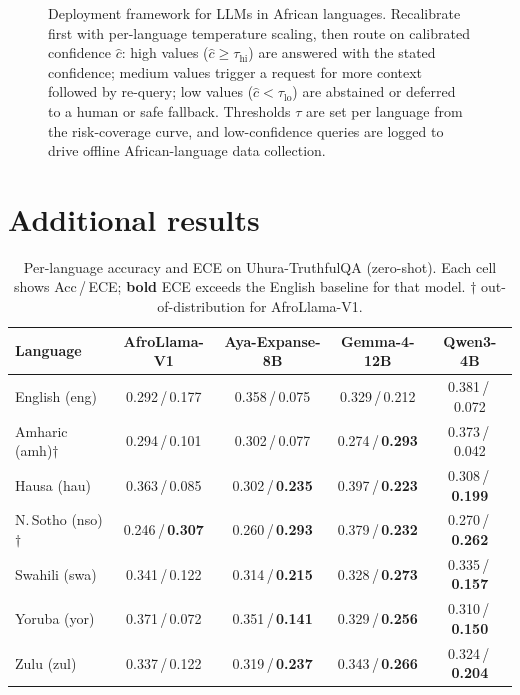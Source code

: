 \documentclass[11pt]{article}
\begin{document}
\begin{figure}[h]
{}
\caption{Deployment framework for LLMs in African languages. Recalibrate first with per-language
temperature scaling, then route on calibrated confidence $\hat{c}$: high values
($\hat{c}\geq\tau_{\mathrm{hi}}$) are answered with the stated confidence; medium values trigger a
request for more context followed by re-query; low values ($\hat{c}<\tau_{\mathrm{lo}}$) are
abstained or deferred to a human or safe fallback. Thresholds $\tau$ are set per language from the
risk-coverage curve, and low-confidence queries are logged to drive offline African-language data
collection.}
\label{fig:framework}
\end{figure}

\section{Additional results}\label{app:figs}

\begin{table}[h]\centering\small
\caption{Per-language accuracy and ECE on Uhura-TruthfulQA (zero-shot). Each cell shows Acc\,/\,ECE;
\textbf{bold} ECE exceeds the English baseline for that model. $\dagger$ out-of-distribution for
AfroLlama-V1.}
\label{tab:uhura_lang}
\begin{tabular}{lcccc}
\toprule
\textbf{Language} & \textbf{AfroLlama-V1} & \textbf{Aya-Expanse-8B} & \textbf{Gemma-4-12B} & \textbf{Qwen3-4B}\\
\midrule
English (eng)               & 0.292\,/\,0.177 & 0.358\,/\,0.075 & 0.329\,/\,0.212 & 0.381\,/\,0.072\\
\midrule
Amharic (amh)$\dagger$      & 0.294\,/\,0.101 & 0.302\,/\,0.077 & 0.274\,/\,\textbf{0.293} & 0.373\,/\,0.042\\
Hausa (hau)                 & 0.363\,/\,0.085 & 0.302\,/\,\textbf{0.235} & 0.397\,/\,\textbf{0.223} & 0.308\,/\,\textbf{0.199}\\
N.\,Sotho (nso)$\dagger$    & 0.246\,/\,\textbf{0.307} & 0.260\,/\,\textbf{0.293} & 0.379\,/\,\textbf{0.232} & 0.270\,/\,\textbf{0.262}\\
Swahili (swa)               & 0.341\,/\,0.122 & 0.314\,/\,\textbf{0.215} & 0.328\,/\,\textbf{0.273} & 0.335\,/\,\textbf{0.157}\\
Yoruba (yor)                & 0.371\,/\,0.072 & 0.351\,/\,\textbf{0.141} & 0.329\,/\,\textbf{0.256} & 0.310\,/\,\textbf{0.150}\\
Zulu (zul)                  & 0.337\,/\,0.122 & 0.319\,/\,\textbf{0.237} & 0.343\,/\,\textbf{0.266} & 0.324\,/\,\textbf{0.204}\\
\bottomrule
\end{tabular}
\end{table}
\end{document}

